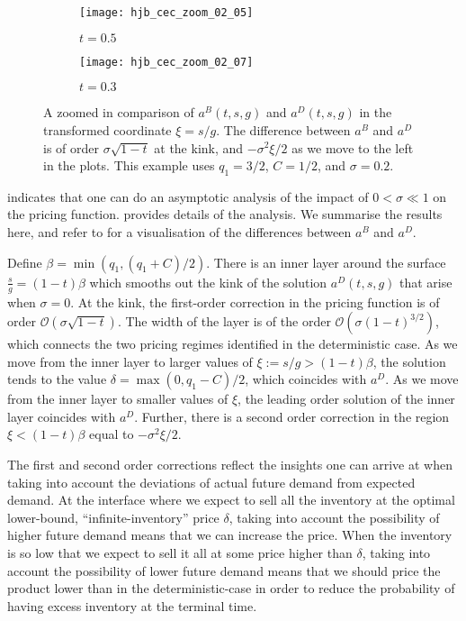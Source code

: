 \documentclass[main.tex]{subfiles}
\begin{document}
\begin{figure}[hbt]
  \centering
  \begin{subfigure}[b]{0.5\textwidth}
    \texttt{[image: hjb\_cec\_zoom\_02\_05]}
    \caption{$t = 0.5$}
  \end{subfigure}%
  \begin{subfigure}[b]{0.5\textwidth}
    \texttt{[image: hjb\_cec\_zoom\_02\_07]}
    \caption{$t=0.3$}
  \end{subfigure}
  \caption{A zoomed in comparison of $a^B(t,s,g)$ and $a^D(t,s,g)$
    in the transformed coordinate $\xi=s/g$.
    The difference between $a^B$ and $a^D$ is of order
    $\sigma\sqrt{1-t}$ at the kink, and
    $-\sigma^2\xi/2$ as we move to the left in the
    plots.
    This example uses $q_1=3/2$, $C=1/2$, and $\sigma=0.2$.
  }\label{fig:hjb_cec_zoom}
\end{figure}
 indicates that one can do an asymptotic analysis
of the impact of $0<\sigma \ll 1$ on the pricing
function.  provides details of the
analysis. We summarise the
results here, and refer to  for a visualisation
of the differences between $a^B$ and $a^D$.
\begin{myresult}\label{res:linear_asymptotics}
  Define $\beta=\min(q_1,(q_1+C)/2)$.
  There is an inner layer around the surface $\frac{s}{g}=(1-t)\beta$ which
  smooths out the kink of the solution $a^D(t,s,g)$ that arise when
  $\sigma=0$. At the kink, the first-order correction in the pricing
  function is of order $\mathcal{O}(\sigma\sqrt{1-t})$.
  The width of the layer is of the order
  $\mathcal{O}(\sigma{(1-t)}^{3/2})$, which connects the two pricing
  regimes identified in the deterministic case.
  As we move from the inner layer to larger values of
  $\xi:=s/g>(1-t)\beta$, the solution
  tends to the value $\delta=\max(0,q_1-C)/2$, which coincides with
  $a^D$. As we move from the inner layer to smaller values of $\xi$,
  the leading order solution of the inner layer coincides with $a^D$.
  Further, there is a second order correction in the region
  $\xi<(1-t)\beta$ equal to $-\sigma^2 \xi/2$.
\end{myresult}

The first and second order corrections reflect the insights one can
arrive at when taking into account the deviations of actual future
demand from expected demand.
At the interface where we expect to sell all the inventory at the
optimal lower-bound, ``infinite-inventory'' price $\delta$, taking
into account the possibility of higher future demand means that we can
increase the price.
When the inventory is so low that we expect to sell it all at some
price higher than $\delta$, taking into account the possibility
of lower future demand means that we should price the product lower than in the
deterministic-case in order to
reduce the probability of having excess inventory at the terminal time.
\end{document}
